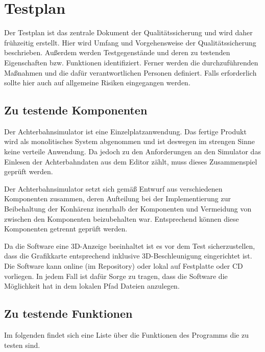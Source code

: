 
\chapter{Testplan}

Der Testplan ist das zentrale Dokument der Qualitätssicherung und wird daher
frühzeitig erstellt. Hier wird Umfang und Vorgehensweise der Qualitätssicherung
beschrieben. Außerdem werden Testgegenstände und deren zu testenden
Eigenschaften bzw. Funktionen identifiziert. Ferner werden die
durchzuführenden Maßnahmen und die dafür verantwortlichen Personen definiert.
Falls erforderlich sollte hier auch auf allgemeine Risiken eingegangen werden.

\section{Zu testende Komponenten}
Der Achterbahnsimulator ist eine Einzelplatzanwendung. Das fertige Produkt wird als monolitisches System abgenommen und ist deswegen im strengen Sinne keine verteile Anwendung. Da jedoch zu den Anforderungen an den Simulator das Einlesen der Achterbahndaten aus dem Editor zählt, muss dieses Zusammenspiel geprüft werden.

Der Achterbahnsimulator setzt sich gemäß Entwurf aus verschiedenen Komponenten zusammen, deren Aufteilung bei der Implementierung zur Beibehaltung der Konhärenz inenrhalb der Komponenten und Vermeidung von zwischen den Komponenten beizubehalten war.
Entsprechend können diese Komponenten getrennt geprüft werden. 

Da die Software eine 3D-Anzeige beeinhaltet ist es vor dem Test sicherzustellen, dass die Grafikkarte entsprechend inklusive 3D-Beschleunigung eingerichtet ist.
Die Software kann online (im Repository) oder lokal auf Festplatte oder CD vorliegen. In jedem Fall ist dafür Sorge zu tragen, dass die Software die Möglichkeit hat in dem lokalen Pfad Dateien anzulegen.

\section{Zu testende Funktionen}
% 
Im folgenden findet sich eine Liste über die Funktionen des Programms die zu testen sind. 

